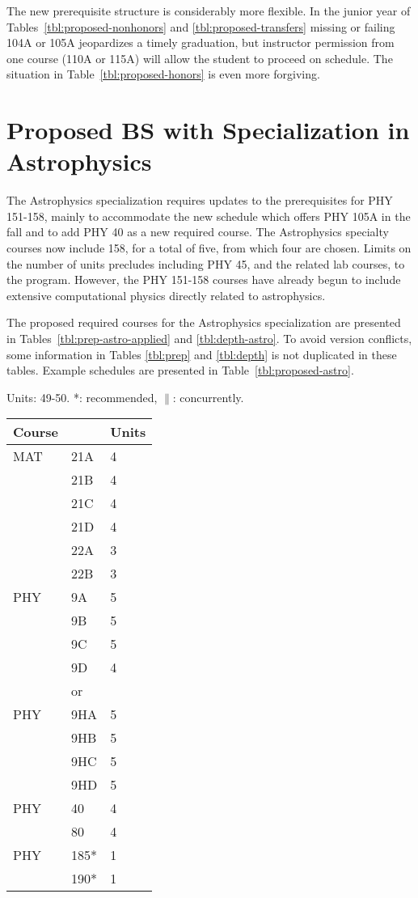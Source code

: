 \documentclass[12pt]{article}
\begin{document}
The new prerequisite structure is considerably more flexible.  In the
junior year of Tables~\ref{tbl:proposed-nonhonors} and
\ref{tbl:proposed-transfers} missing or failing 104A or 105A
jeopardizes a timely graduation, but instructor permission from one
course (110A or 115A) will allow the student to proceed on schedule.
The situation in Table~\ref{tbl:proposed-honors} is even more
forgiving.

\newpage

\section{Proposed BS with Specialization in Astrophysics}
The Astrophysics specialization requires updates to the prerequisites
for PHY 151-158, mainly to accommodate the new schedule which offers
PHY 105A in the fall and to add PHY 40 as a new required course.  The
Astrophysics specialty courses now include 158, for a total of five,
from which four are chosen.  Limits on the number of units precludes
including PHY 45, and the related lab courses, to the program.
However, the PHY 151-158 courses have already begun to include
extensive computational physics directly related to astrophysics.

The proposed required courses for the Astrophysics specialization are presented in
Tables~\ref{tbl:prep-astro-applied} and \ref{tbl:depth-astro}.  To avoid
version conflicts, some information in Tables \ref{tbl:prep} and
\ref{tbl:depth} is not duplicated in these tables.  Example schedules are presented
in Table~\ref{tbl:proposed-astro}.

\noindent
\vskip 0.25cm
\begin{center}
Units:  49-50. *: recommended, $\parallel$: concurrently.\\
\begin{tabular}{|lll|}
\hline
Course & & Units \\
\hline
MAT & 21A & 4 \\  
    & 21B & 4 \\ 
    & 21C & 4 \\ 
    & 21D & 4 \\ 
    & 22A & 3 \\ 
    & 22B & 3 \\ 
\hline
\hline
PHY & 9A & 5 \\  
    & 9B & 5 \\  
    & 9C & 5 \\  
    & 9D & 4 \\  
\hline
&or&\\
\hline
PHY & 9HA & 5 \\  
    & 9HB & 5 \\  
    & 9HC & 5 \\  
    & 9HD & 5 \\  
\hline
\hline
PHY & 40   & 4 \\  
    & 80   & 4 \\ 
PHY & 185* & 1 \\ 
    & 190* & 1 \\ 
\hline
\end{tabular}
\end{center}
\end{document}
